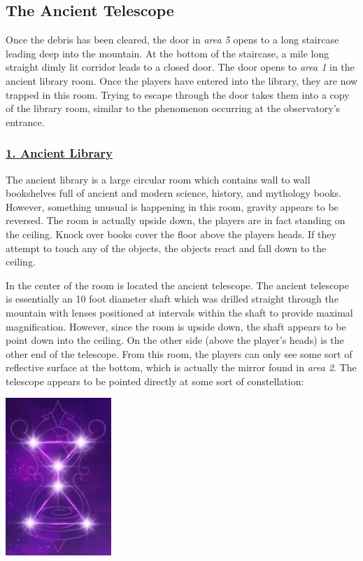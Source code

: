 \documentclass{article}
\begin{document}
\begin{multicols*}{2}
	\section{The Ancient Telescope}
	Once the debris has been cleared, the door in \emph{area 5} opens to a long staircase leading deep into the mountain. At the bottom of the staircase, a mile long straight dimly lit corridor leads to a closed door. The door opens to \emph{area 1} in the ancient library room. Once the players have entered into the library, they are now trapped in this room. Trying to escape through the door takes them into a copy of the library room, similar to the phenomenon occurring at the observatory's entrance.
	
	\subsubsection*{\underline{1. Ancient Library}}
	The ancient library is a large circular room which contains wall to wall bookshelves full of ancient and modern science, history, and mythology books. However, something unusual is happening in this room, gravity appears to be reversed. The room is actually upside down, the players are in fact standing on the ceiling. Knock over books cover the floor above the players heads. If they attempt to touch any of the objects, the objects react and fall down to the ceiling.
	
	In the center of the room is located the ancient telescope. The ancient telescope is essentially an 10 foot diameter shaft which was drilled straight through the mountain with lenses positioned at intervals within the shaft to provide maximal magnification. However, since the room is upside down, the shaft appears to be point down into the ceiling. On the other side (above the player's heads) is the other end of the telescope. From this room, the players can only see some sort of reflective surface at the bottom, which is actually the mirror found in \emph{area 2}. The telescope appears to be pointed directly at some sort of constellation:
	
	\begin{center}
		\includegraphics[width = 0.3\textwidth]{images/constellation}
		

\end{center}
\end{multicols*}
\end{document}

